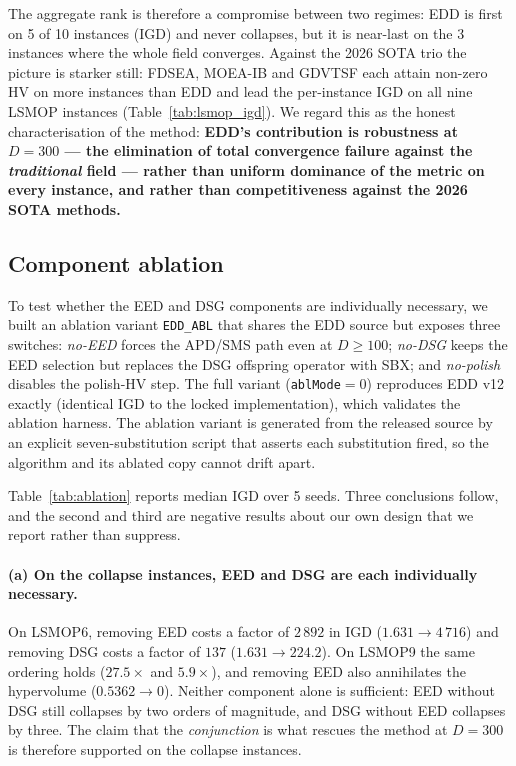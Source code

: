 \documentclass[preprint,12pt]{elsarticle}
\begin{document}
The aggregate rank is therefore a compromise between two regimes: EDD is
first on 5 of 10 instances (IGD) and never collapses, but it is near-last on
the 3 instances where the whole field converges. Against the 2026 SOTA
trio the picture is starker still: FDSEA, MOEA-IB and GDVTSF each attain
non-zero HV on more instances than EDD and lead the per-instance IGD on all
nine LSMOP instances (Table~\ref{tab:lsmop_igd}). We regard this as the
honest characterisation of the method: \textbf{EDD's contribution is
robustness at $D = 300$ --- the elimination of total convergence failure
against the \emph{traditional} field --- rather than uniform dominance of
the metric on every instance, and rather than competitiveness against the
2026 SOTA methods.}

\subsection{Component ablation}
\label{sec:ablation}

To test whether the EED and DSG components are individually necessary, we
built an ablation variant \texttt{EDD\_ABL} that shares the EDD source but
exposes three switches: \emph{no-EED} forces the APD/SMS path even at
$D \ge 100$; \emph{no-DSG} keeps the EED selection but replaces the DSG
offspring operator with SBX; and \emph{no-polish} disables the polish-HV
step. The full variant (\texttt{ablMode}$=0$) reproduces EDD v12 exactly
(identical IGD to the locked implementation), which validates the ablation
harness. The ablation variant is generated from the released source by an
explicit seven-substitution script that asserts each substitution fired, so
the algorithm and its ablated copy cannot drift apart.

Table~\ref{tab:ablation} reports median IGD over 5 seeds. Three conclusions
follow, and the second and third are negative results about our own design
that we report rather than suppress.



\paragraph{(a) On the collapse instances, EED and DSG are each individually
necessary.} On LSMOP6, removing EED costs a factor of $2\,892$ in IGD
($1.631 \to 4\,716$) and removing DSG costs a factor of $137$
($1.631 \to 224.2$). On LSMOP9 the same ordering holds ($27.5\times$ and
$5.9\times$), and removing EED also annihilates the hypervolume
($0.5362 \to 0$). Neither component alone is sufficient: EED without DSG
still collapses by two orders of magnitude, and DSG without EED collapses by
three. The claim that the \emph{conjunction} is what rescues the method at
$D = 300$ is therefore supported on the collapse instances.
\end{document}
